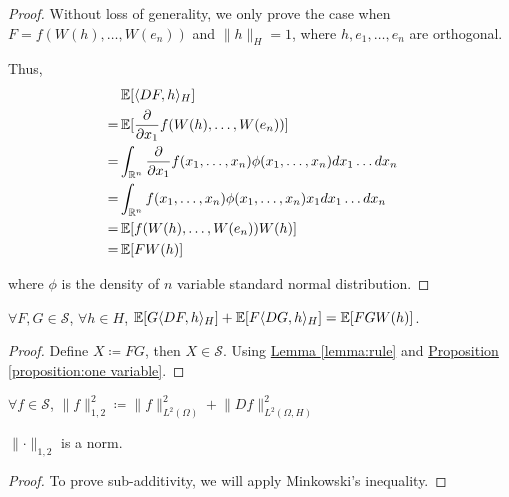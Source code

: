\begin{proof}
Without loss of generality, we only prove the case 
when $F = f(W(h), \dots, W(e_n))$ and $\lVert h \rVert_{H} = 1$, 
where $h, e_1, \dots, e_n$ are orthogonal. 

Thus, 
\begin{equation*}
\begin{aligned}
&\operatorname{\mathbb{E}}[\langle DF, h \rangle_{H}]  \\
= &\operatorname{\mathbb{E}}[\frac{\partial}{\partial x_1} f(W(h), \dots, W(e_n))]
&\text{} \\
= &\int_{\mathbb{R}^n} \frac{\partial}{\partial x_1} f(x_1, \dots, x_n) \phi(x_1, \dots, x_n) d x_1\dots d x_n 
&\text{} \\
= &\int_{\mathbb{R}^n} f(x_1, \dots, x_n) \phi(x_1, \dots, x_n) x_1 d x_1\dots d x_n 
&\text{} \\
= &\operatorname{\mathbb{E}}[f(W(h), \dots, W(e_n))W(h)]
&\text{} \\
= &\operatorname{\mathbb{E}}[FW(h)]
&\text{} \\
\end{aligned}
\end{equation*}

where $\phi$ is the density of $n$ variable standard normal distribution.
\end{proof}

\begin{proposition}
\label{proposition:2 terms}
$\forall F, G \in \mathcal{S}$, $\forall h \in H$, 
$\operatorname{\mathbb{E}}[G \langle DF, h \rangle_{H}] 
+  \operatorname{\mathbb{E}}[F \langle DG, h \rangle_{H}] 
= \operatorname{\mathbb{E}}[FGW(h)]$. 
\end{proposition}

\begin{proof}
Define $X \coloneqq FG$, then $X \in \mathcal{S}$. 
Using \hyperref[lemma:rule]
{Lemma \ref*{lemma:rule}}
and 
\hyperref[proposition:one variable]
{Proposition \ref*{proposition:one variable}}. 
\end{proof}

\begin{notation}
$\forall f \in \mathcal{S}$, 
$\lVert f \rVert_{1, 2}^2 \coloneqq 
\lVert f \rVert_{L^2(\Omega)}^2
+ \lVert Df \rVert_{L^2(\Omega, H)}^2$
\end{notation}

\begin{proposition}
\label{proposition:Soblev norm}
$\lVert \cdot \rVert_{1, 2}$ is a norm. 
\end{proposition}

\begin{proof}
To prove sub-additivity, we will apply Minkowski's inequality. 
\end{proof}

